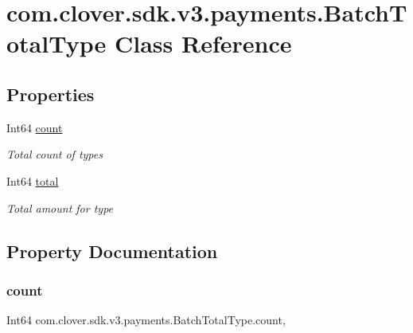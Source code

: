\hypertarget{classcom_1_1clover_1_1sdk_1_1v3_1_1payments_1_1_batch_total_type}{}\section{com.\+clover.\+sdk.\+v3.\+payments.\+Batch\+Total\+Type Class Reference}
\label{classcom_1_1clover_1_1sdk_1_1v3_1_1payments_1_1_batch_total_type}
\subsection*{Properties}
\begin{DoxyCompactItemize}
\item 
Int64 \hyperlink{classcom_1_1clover_1_1sdk_1_1v3_1_1payments_1_1_batch_total_type_a0fdb3e90182ba6f3ef7638757ba2d367}{count}
\begin{DoxyCompactList}\small\item\em Total count of types \end{DoxyCompactList}\item 
Int64 \hyperlink{classcom_1_1clover_1_1sdk_1_1v3_1_1payments_1_1_batch_total_type_aa1fbbae3f87aa1c20b15cab3e1e03dd7}{total}
\begin{DoxyCompactList}\small\item\em Total amount for type \end{DoxyCompactList}\end{DoxyCompactItemize}


\subsection{Property Documentation}
\mbox{\label{classcom_1_1clover_1_1sdk_1_1v3_1_1payments_1_1_batch_total_type_a0fdb3e90182ba6f3ef7638757ba2d367}} 
\subsubsection{\texorpdfstring{count}{count}}
{\footnotesize\ttfamily Int64 com.\+clover.\+sdk.\+v3.\+payments.\+Batch\+Total\+Type.\+count\hspace{0.3cm}{\ttfamily [get]}, {\ttfamily [set]}}



